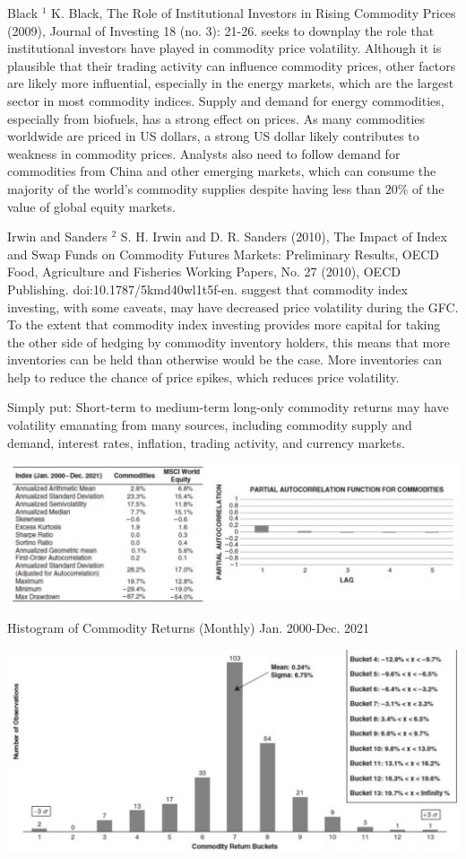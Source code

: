 \documentclass[11pt]{article}
\begin{document}
Black ${ }^{1}$ K. Black, The Role of Institutional Investors in Rising Commodity Prices (2009), Journal of Investing 18 (no. 3): 21-26. seeks to downplay the role that institutional investors have played in commodity price volatility. Although it is plausible that their trading activity can influence commodity prices, other factors are likely more influential, especially in the energy markets, which are the largest sector in most commodity indices. Supply and demand for energy commodities, especially from biofuels, has a strong effect on prices. As many commodities worldwide are priced in US dollars, a strong US dollar likely contributes to weakness in commodity prices. Analysts also need to follow demand for commodities from China and other emerging markets, which can consume the majority of the world's commodity supplies despite having less than $20 \%$ of the value of global equity markets.

Irwin and Sanders ${ }^{2}$ S. H. Irwin and D. R. Sanders (2010), The Impact of Index and Swap Funds on Commodity Futures Markets: Preliminary Results, OECD Food, Agriculture and Fisheries Working Papers, No. 27 (2010), OECD Publishing. doi:10.1787/5kmd40wl1t5f-en. suggest that commodity index investing, with some caveats, may have decreased price volatility during the GFC. To the extent that commodity index investing provides more capital for taking the other side of hedging by commodity inventory holders, this means that more inventories can be held than otherwise would be the case. More inventories can help to reduce the chance of price spikes, which reduces price volatility.

Simply put: Short-term to medium-term long-only commodity returns may have volatility emanating from many sources, including commodity supply and demand, interest rates, inflation, trading activity, and currency markets.

\begin{center}
\includegraphics[max width=\textwidth]{2024_04_11_1a00330971bbdbb6beefg-3}
\end{center}

Histogram of Commodity Returns (Monthly) Jan. 2000-Dec. 2021

\begin{center}
\includegraphics[max width=\textwidth]{2024_04_11_1a00330971bbdbb6beefg-3(1)}
\end{center}
\end{document}
